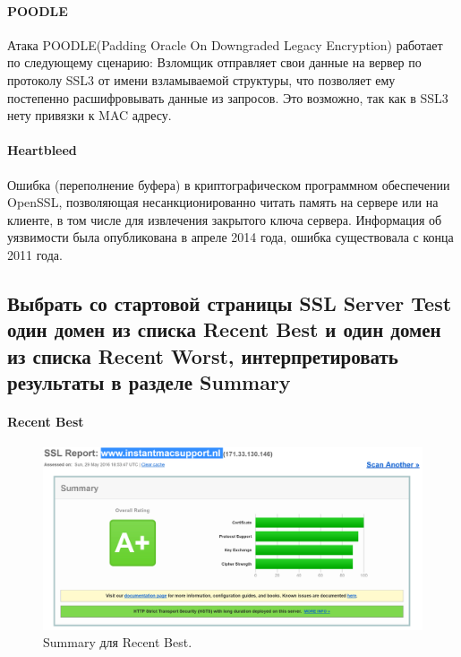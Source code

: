\documentclass[10pt,a4paper]{article}
\begin{document}
\paragraph {POODLE\\}
Атака POODLE(Padding Oracle On Downgraded Legacy Encryption) работает по следующему сценарию: Взломщик отправляет свои данные на вервер по протоколу SSL3 от имени взламываемой структуры, что позволяет ему постепенно расшифровывать данные из запросов. Это возможно, так как в SSL3 нету привязки к MAC адресу.

\paragraph {Heartbleed\\}
Ошибка (переполнение буфера) в криптографическом программном обеспечении OpenSSL, позволяющая несанкционированно читать память на сервере или на клиенте, в том числе для извлечения закрытого ключа сервера. Информация об уязвимости была опубликована в апреле 2014 года, ошибка существовала с конца 2011 года.

\subsection{Выбрать со стартовой страницы SSL Server Test один домен из списка Recent Best и один домен из списка Recent Worst, интерпретировать результаты в разделе Summary}

\paragraph {Recent Best\\}

\begin{figure}[h]
\centering
\includegraphics[width=\textwidth]{instantmacsupport_nl_summary.png}
\caption{Summary для Recent Best.}
\end{figure}
\end{document}
